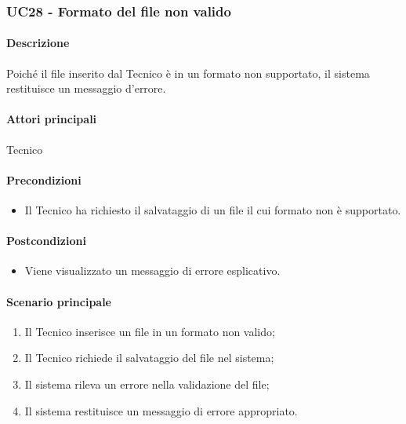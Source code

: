 \subsubsection{UC28 - Formato del file non valido}\label{UC28}
\paragraph*{Descrizione}
Poiché il file inserito dal Tecnico è in un formato non supportato, il sistema restituisce un messaggio d'errore.

\paragraph*{Attori principali}
Tecnico

\paragraph*{Precondizioni}
\begin{itemize}
  \item Il Tecnico ha richiesto il salvataggio di un file il cui formato non è supportato.
\end{itemize}

\paragraph*{Postcondizioni}
\begin{itemize}
  \item Viene visualizzato un messaggio di errore esplicativo.
\end{itemize}

\paragraph*{Scenario principale}
\begin{enumerate}
  \item Il Tecnico inserisce un file in un formato non valido;
  \item Il Tecnico richiede il salvataggio del file nel sistema;
  \item Il sistema rileva un errore nella validazione del file;
  \item Il sistema restituisce un messaggio di errore appropriato.
\end{enumerate}